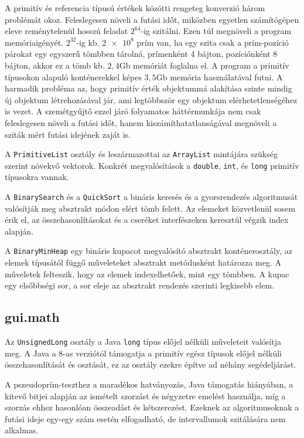 A primitív és referencia típusú értékek közötti rengeteg konverzió három problémát okoz.
Feleslegesen növeli a futási időt, miközben egyetlen számítógépen eleve reménytelenül hosszú feladat $2^{64}$-ig szitálni.
Ezen túl megnöveli a program memóriaigényét.
$2^{32}$-ig kb. $\num{2e8}$ prím van, ha egy szita csak a prím-pozíció párokat egy egyszerű tömbben tárolná, prímenként 4 bájton, pozíciónként 8 bájton, akkor ez a tömb kb. $2,4$Gb memóriát foglalna el.
A program a primitív típusokon alapuló konténerekkel képes $3,5$Gb memória használatával futni.
A harmadik probléma az, hogy primitív érték objektummá alakítása szinte mindig új objektum létrehozásával jár, ami legtöbbször egy objektum elérhetetlenségéhez is vezet.
A szemétgyűjtő ezzel járó folyamatos háttérmunkája nem csak feleslegesen növeli a futási időt, hanem kiszámíthatatlanságával megnöveli a sziták mért futási idejének zaját is.

A \texttt{PrimitiveList} osztály és leszármazottai az \texttt{ArrayList} mintájára szükség szerint növekvő vektorok. Konkrét megvalósítások a \texttt{double}, \texttt{int}, és \texttt{long} primitív típusokra vannak.

A \texttt{BinarySearch} és a \texttt{QuickSort} a bináris keresés és a gyorsrendezés algoritmusát valósítják meg absztrakt módon elért tömb felett.
Az elemeket közvetlenül sosem érik el, az összehasonlításokat és a cseréket interfészeken keresztül végzik index alapján.

A \texttt{BinaryMinHeap} egy bináris kupacot megvalósító absztrakt konténerosztály, az elemek típusától függő műveleteket absztrakt metódusként határozza meg.
A műveletek felteszik, hogy az elemek indexelhetőek, mint egy tömbben.
A kupac egy elsőbbségi sor, a sor eleje az absztrakt rendezés szerinti legkisebb elem.

\subsection{gui.math}

Az \texttt{UnsignedLong} osztály a Java \texttt{long} típus előjel nélküli műveleteit valósítja meg.
A Java a 8-as verziótól támogatja a primitív egész típusok előjel nélküli összehasonlítását és osztását, ez az osztály ezekre építve ad néhány segédeljárást.

A pszeudoprím-teszthez a maradékos hatványozás, Java támogatás hiányában, a kitevő bitjei alapján az ismételt szorzást és négyzetre emelést használja, míg a szorzás ehhez hasonlóan összeadást és kétszerezést.
Ezeknek az algoritmusoknak a futási ideje egy-egy szám esetén elfogadható, de intervallumok szitálására nem alkalmas.

